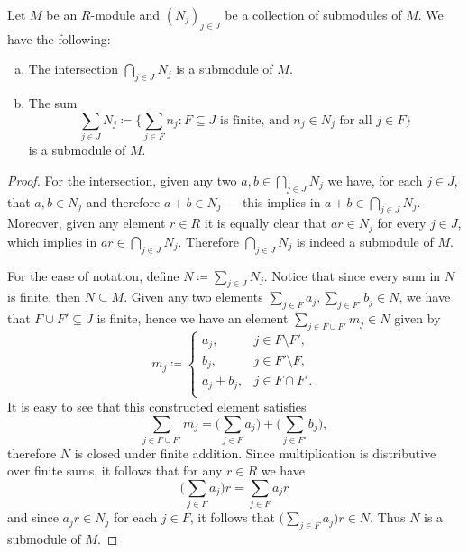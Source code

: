 \begin{example}
    \label{exp:intersection-sum-submodules}
    Let \(M\) be an \(R\)-module and \((N_j)_{j \in J}\) be a collection of
    submodules of \(M\). We have the following:
    \begin{enumerate}[(a)]\setlength\itemsep{0em}
        \item The intersection \(\bigcap_{j \in J} N_j\) is a submodule of \(M\).
        \item The sum
              \[
                  \sum_{j \in J} N_j \coloneq \bigg\{
                  \sum_{j \in F} n_j \colon F \subseteq J
                  \text{ is finite, and } n_j \in N_j \text{ for all } j \in F
                  \bigg\}
              \]
              is a submodule of \(M\).
    \end{enumerate}
    \begin{proof}
        For the intersection, given any two \(a, b \in \bigcap_{j \in J} N_j\) we have,
        for each \(j \in J\), that \(a, b \in N_j\) and therefore \(a + b \in N_j\) ---
        this implies in \(a + b \in \bigcap_{j \in J} N_j\). Moreover, given any element
        \(r \in R\) it is equally clear that \(a r \in N_j\) for every \(j \in J\),
        which implies in \(a r \in \bigcap_{j \in J} N_j\). Therefore
        \(\bigcap_{j \in J} N_j\) is indeed a submodule of \(M\).

        For the ease of notation, define \(N \coloneq \sum_{j \in J} N_j\). Notice that
        since every sum in \(N\) is finite, then \(N \subseteq M\). Given any two
        elements \(\sum_{j \in F} a_j, \sum_{j \in F'} b_j \in N\), we have that
        \(F \cup F' \subseteq J\) is finite, hence we have an element
        \(\sum_{j \in F \cup F'} m_j \in N\) given by
        \[
            m_j \coloneq
            \begin{cases}
                a_j,       & j \in F \setminus F', \\
                b_j,       & j \in F' \setminus F, \\
                a_j + b_j, & j \in F \cap F'.      \\
            \end{cases}
        \]
        It is easy to see that this constructed element satisfies
        \[
            \sum_{j \in F \cup F'} m_j =
            \bigg( \sum_{j \in F} a_j \bigg) +
            \bigg( \sum_{j \in F'} b_j \bigg),
        \]
        therefore \(N\) is closed under finite addition. Since multiplication is
        distributive over finite sums, it follows that for any \(r \in R\) we have
        \[
            \bigg( \sum_{j \in F} a_j \bigg) r = \sum_{j \in F} a_j r
        \]
        and since \(a_j r \in N_j\) for each \(j \in F\), it follows that
        \(\big( \sum_{j \in F} a_j \big) r \in N\). Thus \(N\) is a submodule of
        \(M\).
    \end{proof}
\end{example}

